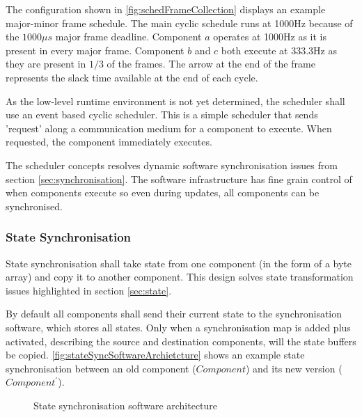 The configuration shown in \autoref{fig:schedFrameCollection} displays an example major-minor frame schedule. The main cyclic schedule runs at 1000Hz because of the $1000\mu s$ major frame deadline. Component $a$ operates at 1000Hz as it is present in every major frame. Component $b$ and $c$ both execute at 333.3Hz as they are present in $1/3$ of the frames. The arrow at the end of the frame represents the slack time available at the end of each cycle.

As the low-level runtime environment is not yet determined, the scheduler shall use an event based cyclic scheduler. This is a simple scheduler that sends 'request' along a communication medium for a component to execute. When requested, the component immediately executes.

The scheduler concepts resolves dynamic software synchronisation issues from section \ref{sec:synchronisation}. The software infrastructure has fine grain control of when components execute so even during updates, all components can be synchronised.
    
\clearpage

\subsubsection{State Synchronisation}
State synchronisation shall take state from one component (in the form of a byte array) and copy it to another component. This design solves state transformation issues highlighted in section \ref{sec:state}.

By default all components shall send their current state to the synchronisation software, which stores all states. Only when a synchronisation map is added plus activated, describing the source and destination components, will the state buffers be copied. \autoref{fig:stateSyncSoftwareArchietcture} shows an example state synchronisation between an old component ($Component$) and its new version ($Component^{\prime}$).

\begin{figure}[ht]
    \centering
    \caption[State synchronisation software architecture]
    {State synchronisation software architecture}
    \label{fig:stateSyncSoftwareArchietcture}
\end{figure}

